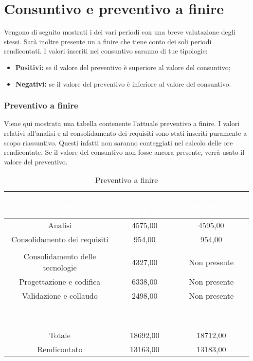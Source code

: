 \section{Consuntivo e preventivo a finire}
\label{consuntivo_preventivo_a_finire}
Vengono di seguito mostrati i  dei vari periodi con una breve valutazione degli stessi. Sarà inoltre presente un  a finire che tiene conto dei soli periodi rendicontati. I valori inseriti nel consuntivo saranno di tue tipologie:
\begin {itemize}
	\item \textbf{Positivi:} se il valore del preventivo è superiore al valore del consuntivo;
	\item \textbf{Negativi:} se il valore del preventivo è inferiore al valore del consuntivo.
\end{itemize}


\subsubsection{Preventivo a finire}
Viene qui mostrata una tabella contenente l'attuale preventivo a finire. I valori relativi all'analisi e al consolidamento dei requisiti sono stati inseriti puramente a scopo riassuntivo. Questi infatti non saranno conteggiati nel calcolo delle ore rendicontate. Se il valore del consuntivo non fosse ancora presente, verrà usato il valore del preventivo.
\begin{table}[H]
	\centering
	\begin{tabular}{|c|c|c|}
	\rowcolor{darkblue} 
		\textcolor{white}{Periodo}		&\textcolor{white}{Preventivo €}&	\textcolor{white}{Consuntivo €}\\ \hline
		Analisi							&	4575,00						&	4595,00 \\ \hline
		Consolidamento dei requisiti	&	954,00						&	954,00 \\ \hline
		\rowcolor{darkblue} \multicolumn{3}{|c|}{\textcolor{white}{Rendicontato}}\\ \hline
		Consolidamento delle tecnologie	&	4327,00						&	Non presente \\ \hline
		Progettazione e codifica		&	6338,00						&	Non presente \\ \hline
		Validazione e collaudo			&	2498,00						&	Non presente \\ \hline
		\rowcolor{darkblue}				&\textcolor{white}{Preventivo €}&	\textcolor{white}{Preventivo a finire €}\\ \hline
		Totale							&	18692,00					&	18712,00 \\ \hline
		Rendicontato					&	13163,00					&	13183,00 \\ \hline
	\end{tabular}
	\caption{Preventivo a finire}
\end{table}